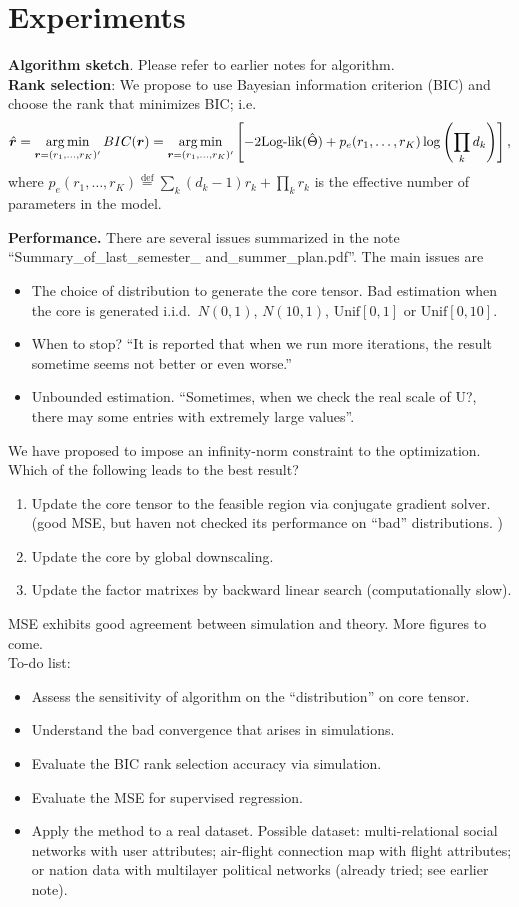 \documentclass[11pt]{article}
\theoremstyle{plain}
\theoremstyle{definition}
\begin{document}
\section{Experiments}
{\bf Algorithm sketch}. Please refer to earlier notes for algorithm. \\
{\bf Rank selection}: We propose to use Bayesian information criterion (BIC) and choose the rank that minimizes BIC; i.e.
\[
\hat {\bm{r}}=\operatorname*{arg\,min}_{\bm{r}=(r_1,\ldots,r_K)'} BIC(\bm{r})=\operatorname*{arg\,min}_{\bm{r}=(r_1,\ldots,r_K)'}\left[-2\text{Log-lik}(\hat \Theta)+p_e(r_1,\ldots,r_K)\log \left(\prod_k d_k\right) \right],
\]
where $p_e(r_1,\ldots,r_K)\stackrel{\text{def}}{=}\sum_k (d_k-1)r_k+\prod_k r_k$ is the effective number of parameters in the model. 

{\bf Performance.} There are several issues summarized in the note ``Summary\_of\_last\_semester\_
and\_summer\_plan.pdf''. The main issues are
\begin{itemize}
\item The choice of distribution to generate the core tensor. Bad estimation when the core is generated i.i.d.\ $N(0,1)$, $N(10,1)$, $\text{Unif}[0,1]$ or $\text{Unif}[0,10]$.
\item When to stop? ``It is reported that when we run more iterations, the result sometime seems not better or even worse.''
\item Unbounded estimation. ``Sometimes, when we check the real scale of U?, there may some entries with extremely large values''.
\end{itemize}
We have proposed to impose an infinity-norm constraint to the optimization. Which of the following leads to the best result?
\begin{enumerate}
\item Update the core tensor to the feasible region via conjugate gradient solver. (good MSE, but haven not checked its performance on ``bad'' distributions. )
\item Update the core by global downscaling.
\item Update the factor matrixes by backward linear search (computationally slow).
\end{enumerate}


MSE exhibits good agreement between simulation and theory. More figures to come.\\
To-do list:
\begin{itemize}
\item Assess the sensitivity of algorithm on the ``distribution'' on core tensor. 
\item Understand the bad convergence that arises in simulations.  
\item Evaluate the BIC rank selection accuracy via simulation.
\item Evaluate the MSE for supervised regression.
\item Apply the method to a real dataset. Possible dataset: multi-relational social networks with user attributes; air-flight connection map with flight attributes; or nation data with multilayer political networks (already tried; see earlier note). 
\end{itemize}
\end{document}

